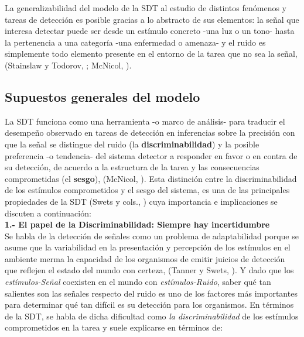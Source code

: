 La generalizabilidad del modelo de la SDT al estudio de distintos fenómenos y tareas de detección es posible gracias a lo abstracto de sus elementos: la señal que interesa detectar puede ser desde un estímulo concreto -una luz o un tono- hasta la pertenencia a una categoría -una enfermedad o amenaza- y el ruido es simplemente todo elemento presente en el entorno de la tarea que no sea la señal, (Stainslaw y Todorov, \citeyear{Stainslaw1999}; McNicol, \citeyear{McNicol1}).\\ 

\subsection{Supuestos generales del modelo}

La SDT funciona como una herramienta -o marco de análisis- para traducir el desempeño observado en tareas de detección en inferencias sobre la precisión con que la señal se distingue del ruido (la \textbf{discriminabilidad}) y la posible preferencia -o tendencia- del sistema detector a responder en favor o en contra de su detección, de acuerdo a la estructura de la tarea y las consecuencias comprometidas (el \textbf{sesgo}), (McNicol, \citeyear{McNicol1}). Esta distinción entre la discriminabilidad de los estímulos comprometidos y el sesgo del sistema, es una de las principales propiedades de la SDT (Swets y cols., \citeyear{Swets1961}) cuya importancia e implicaciones se discuten a continuación:\\

\textbf{1.- El papel de la Discriminabilidad: Siempre hay incertidumbre}\\

Se habla de la detección de señales como un problema de adaptabilidad porque se asume que la variabilidad en la presentación y percepción de los estímulos en el ambiente merma la capacidad de los organismos de emitir juicios de detección que reflejen el estado del mundo con certeza, (Tanner y Swets, \citeyear{Tanner1954}). Y dado que los \textit{estímulos-Señal} coexisten en el mundo con \textit{estímulos-Ruido}, saber qué tan salientes son las señales respecto del ruido es uno de los factores más importantes para determinar qué tan difícil es su detección para los organismos. En términos de la SDT, se habla de dicha dificultad como \textit{la discriminabilidad} de los estímulos comprometidos en la tarea y suele explicarse en términos de:\\


